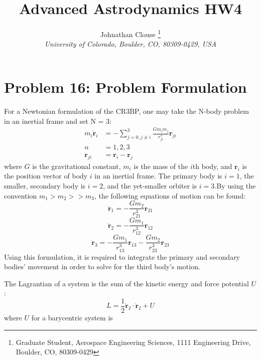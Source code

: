 \documentclass[]{aiaa-tc}%
\title{Advanced Astrodynamics HW4}
\author{
	Johnathan Clouse%
	\thanks{Graduate Student, Aerospace Engineering Sciences, 1111 Engineering Drive, Boulder, CO, 80309-0429}\\
	{\normalsize\itshape
		University of Colorado, Boulder, CO, 80309-0429, USA}
}
\begin{document}
	

	
	\maketitle
	
	\begin{abstract}
		\noindent 
		
	\end{abstract}
	
	\newpage
	
	\tableofcontents
	
	\newpage
	\section{Problem 16: Problem Formulation}
For a Newtonian formulation of the CR3BP, one may take the N-body problem in an inertial frame and set N = 3:
\begin{equation}
\begin{aligned}
m_i\mathbf{\ddot{r}}_i &= -\sum_{j=0,j\neq i}^{3}\frac{Gm_im_j}{r_{ji}^3}\mathbf{r}_{ji}\\
n&=1,2,3\\
\mathbf{r}_{ji}&=\mathbf{r}_{i}-\mathbf{r}_{j}
 \end{aligned}
\end{equation}
where $G$ is the gravitational constant, $m_i$ is the mass of the $i$th body, and $\mathbf{r}_i$ is the position vector of body $i$ in an inertial frame. The primary body is $i=1$, the smaller, secondary body is $i=2$, and the yet-smaller orbiter is $i=3$.By using the convention $m_1>m_2>>m_3$, the following equations of motion can be found:
\begin{equation}
\mathbf{\ddot{r}}_1 = -\frac{Gm_2}{r_{21}^3}\mathbf{r}_{21}
\end{equation}
\begin{equation}
\mathbf{\ddot{r}}_2 = -\frac{Gm_1}{r_{12}^3}\mathbf{r}_{12}
\end{equation}
\begin{equation}
\mathbf{\ddot{r}}_3 = -\frac{Gm_1}{r_{13}^3}\mathbf{r}_{13} -\frac{Gm_2}{r_{23}^3}\mathbf{r}_{23}
\end{equation}
Using this formulation, it is required to integrate the primary and secondary bodies' movement in order to solve for the third body's motion.


The Lagrantian of a system is the sum of the kinetic energy and force potential $U$:
\begin{equation}
L = \frac{1}{2}\mathbf{\dot{r}}_I\cdot \mathbf{\dot{r}}_I +U
\end{equation}
where $U$ for a barycentric system is
\end{document}
